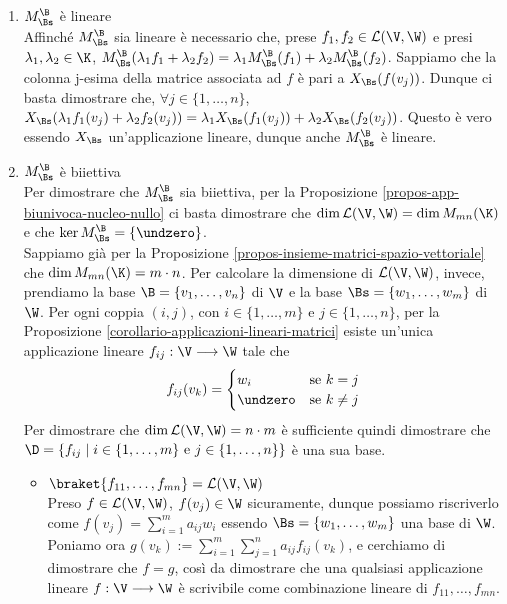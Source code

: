 \documentclass[11pt, a4paper, titlepage, oneside]{scrbook}
\begin{document}
\begin{enumerate}[label=\arabic*°]
    \item $M_\Bs^\B$ è lineare \\
    Affinché $M_\Bs^\B$ sia lineare è necessario che, prese $f_1, f_2 \in \mathcal{L}(\V, \W)$ e presi $\lambda_1, \lambda_2 \in \K$, $M_\Bs^\B(\lambda_1 f_1 + \lambda_2 f_2) = \lambda_1 M_\Bs^\B(f_1) + \lambda_2 M_\Bs^\B(f_2)$. Sappiamo che la colonna j-esima della matrice associata ad $f$ è pari a $X_\Bs(f(v_j))$. Dunque ci basta dimostrare che, $\forall j \in \{1, \ldots, n\}$, \mbox{$X_\Bs(\lambda_1 f_1(v_j) + \lambda_2 f_2(v_j)) = \lambda_1 X_\Bs(f_1(v_j)) + \lambda_2 X_\Bs(f_2(v_j))$}. Questo è vero essendo $X_\Bs$ un'applicazione lineare, dunque anche $M_\Bs^\B$ è lineare.
    \item $M_\Bs^\B$ è biiettiva \\
    Per dimostrare che $M_\Bs^\B$ sia biiettiva, per la Proposizione \ref{propos-app-biunivoca-nucleo-nullo} ci basta dimostrare che $\dim \mathcal{L}(\V, \W) = \dim M_{mn}(\K)$ e che $\ker M_\Bs^\B = \{\undzero\}$. \\
    Sappiamo già per la Proposizione \ref{propos-insieme-matrici-spazio-vettoriale} che $\dim M_{mn}(\K) = m \cdot n$. Per calcolare la dimensione di $\mathcal{L}(\V, \W)$, invece, prendiamo la base $\B = \{v_1, \ldots, v_n\}$ di $\V$ e la base $\Bs = \{w_1, \ldots, w_m\}$ di $\W$. 
    Per ogni coppia $(i,j)$, con $i \in \{1, \ldots, m\}$ e $j \in \{1, \ldots, n\}$, per la Proposizione \ref{corollario-applicazioni-lineari-matrici} esiste un'unica applicazione lineare $f_{ij}: \V \longrightarrow \W$ tale che 
    \[
    f_{ij}(v_k)=
    \begin{cases}
     w_i & \text{se } k = j \\
     \undzero & \text{se } k \neq j 
    \end{cases}
    \]
    Per dimostrare che $\dim \mathcal{L}(\V, \W) = n \cdot m$ è sufficiente quindi dimostrare che \mbox{$\D = \{f_{ij} \mid i \in \{1, \ldots, m\} \text{ e } j \in \{1, \ldots, n\}\}$} è una sua base.
    \begin{itemize}
        \item $\braket{f_{11}, \ldots, f_{mn}} = \mathcal{L}(\V, \W)$ \\
        Preso $f \in \mathcal{L}(\V, \W)$, $f(v_j) \in \W$ sicuramente, dunque possiamo riscriverlo come $f(v_j) = \sum_{i = 1}^m a_{ij} w_i$ essendo $\Bs = \{w_1, \ldots, w_m\}$ una base di $\W$.
        Poniamo ora \mbox{$g(v_k):= \sum_{i = 1}^m \sum_{j = 1}^n a_{ij} f_{ij}(v_k)$}, e cerchiamo di dimostrare che $f = g$, così da dimostrare che una qualsiasi applicazione lineare $f: \V \longrightarrow \W$ è scrivibile come combinazione lineare di $f_{11}, \ldots, f_{mn}$. \\

\end{itemize}
\end{enumerate}
\end{document}
